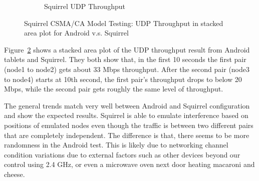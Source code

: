 \documentclass[12pt]{report}
\begin{document}
\begin{figure}[h]
\begin{center}
\begin{subfigure}[h]{\textwidth}
      \caption{\label{fig:squirrel_preliminary_squirrel}Squirrel UDP Throughput}
    \end{subfigure}
    \caption{\label{fig:squirrel_preliminary}Squirrel CSMA/CA Model Testing: UDP Throughput in stacked area plot for Android v.s. Squirrel}
  \end{center}
\end{figure}

Figure~\ref{fig:squirrel_preliminary} shows a stacked area plot of the UDP throughput result from Android tablets and Squirrel. They both show that, in the first 10 seconds the first pair (node1 to node2) gets about 33 Mbps throughput. After the second pair (node3 to node4) starts at 10th second, the first pair's throughput drops to below 20 Mbps, while the second pair gets roughly the same level of throughput.

The general trends match very well between Android and Squirrel configuration and show the expected results. Squirrel is able to emulate interference based on positions of emulated nodes even though the traffic is between two different pairs that are completely independent. The difference is that, there seems to be more randomness in the Android test. This is likely due to networking channel condition variations due to external factors such as other devices beyond our control using 2.4 GHz, or even a microwave oven next door heating macaroni and cheese.
\end{document}
